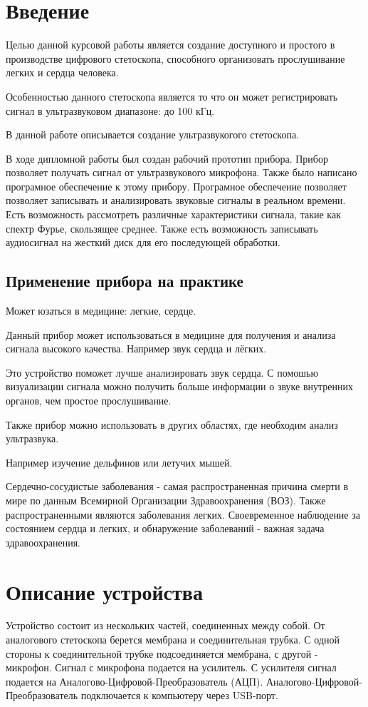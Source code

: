 \tableofcontents
\newpage 
\section{Введение}
Целью данной курсовой работы является создание доступного и простого в производстве цифрового стетоскопа, способного организовать прослушивание легких и сердца человека.

Особенностью данного стетоскопа является то что он может регистрировать сигнал в ультразвуковом диапазоне: до 100 кГц.

В данной работе описывается создание ультразвукогого стетоскопа.

В ходе дипломной работы был создан рабочий прототип прибора. Прибор позволяет получать сигнал от ультразвукового микрофона. Также было написано програмное обеспечение к этому прибору. Програмное обеспечение позволяет позволяет записывать и анализировать звуковые сигналы в реальном времени. Есть возможность рассмотреть различные характеристики сигнала, такие как спектр Фурье, скользящее среднее. Также есть возможность записывать аудиосигнал на жесткий диск для его последующей обработки.

\subsection{Применение прибора на практике}
Может юзаться в медицине: легкие, сердце.

Данный прибор может использоваться в медицине для получения и анализа сигнала высокого качества. Например звук сердца и лёгких. 

Это устройство поможет лучше анализировать звук сердца. С помошью визуализации сигнала можно получить больше информации о звуке внутренних органов, чем простое прослушивание.

Также прибор можно использовать в других областях, где необходим анализ ультразвука. 

Например изучение дельфинов или летучих мышей. 

Сердечно-сосудистые заболевания - самая распространенная причина смерти в мире по данным Всемирной Организации Здравоохранения (ВОЗ). Также распространенными являются заболевания легких. Своевременное наблюдение за состоянием сердца и легких, и обнаружение заболеваний - важная задача здравоохранения.

\newpage  
\section{Описание устройства}
Устройство состоит из нескольких частей, соединенных между собой. От аналогового стетоскопа берется мембрана и соединительная трубка. С одной стороны к соединительной трубке подсоединяется мембрана, с другой - микрофон. Сигнал с микрофона подается на усилитель. С усилителя сигнал подается на Аналогово-Цифровой-Преобразователь (АЦП). Аналогово-Цифровой-Преобразователь подключается к компьютеру через USB-порт.

